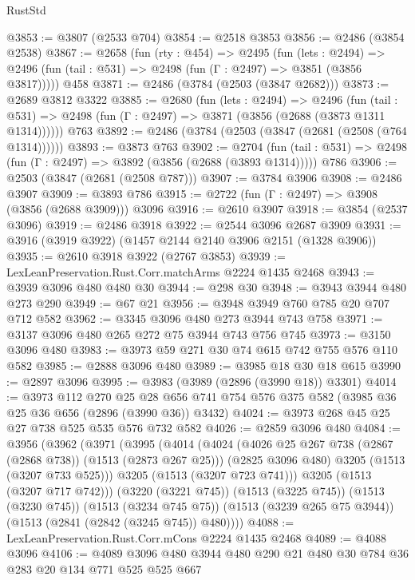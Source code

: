 \begin{lexlean}{RustStd}
\begin{coremodule}
@3853 := @3807 (@2533 @704)
@3854 := @2518 @3853
@3856 := @2486 (@3854 @2538)
@3867 := @2658
    (fun (rty : @454) =>
    @2495
      (fun (lets : @2494) =>
      @2496 (fun (tail : @531) => @2498 (fun (Γ : @2497) => @3851 (@3856 @3817)))))
    @458
@3871 := @2486 (@3784 (@2503 (@3847 @2682)))
@3873 := @2689 @3812 @3322
@3885 := @2680
    (fun (lets : @2494) =>
    @2496
      (fun (tail : @531) => @2498 (fun (Γ : @2497) => @3871 (@3856 (@2688 (@3873 @1311 @1314))))))
    @763
@3892 := @2486 (@3784 (@2503 (@3847 (@2681 (@2508 (@764 @1314))))))
@3893 := @3873 @763
@3902 := @2704
    (fun (tail : @531) => @2498 (fun (Γ : @2497) => @3892 (@3856 (@2688 (@3893 @1314)))))
    @786
@3906 := @2503 (@3847 (@2681 (@2508 @787)))
@3907 := @3784 @3906
@3908 := @2486 @3907
@3909 := @3893 @786
@3915 := @2722 (fun (Γ : @2497) => @3908 (@3856 (@2688 @3909))) @3096
@3916 := @2610 @3907
@3918 := @3854 (@2537 @3096)
@3919 := @2486 @3918
@3922 := @2544 @3096 @2687 @3909
@3931 := @3916 (@3919 @3922) (@1457 @2144 @2140 @3906 @2151 (@1328 @3906))
@3935 := @2610 @3918 @3922 (@2767 @3853)
@3939 := LexLeanPreservation.Rust.Corr.matchArms @2224 @1435 @2468
@3943 := @3939 @3096 @480 @480 @30
@3944 := @298 @30
@3948 := @3943 @3944 @480 @273 @290
@3949 := @67 @21
@3956 := @3948 @3949 @760 @785 @20 @707 @712 @582
@3962 := @3345 @3096 @480 @273 @3944 @743 @758
@3971 := @3137 @3096 @480 @265 @272 @75 @3944 @743 @756 @745
@3973 := @3150 @3096 @480
@3983 := @3973 @59 @271 @30 @74 @615 @742 @755 @576 @110 @582
@3985 := @2888 @3096 @480
@3989 := @3985 @18 @30 @18 @615
@3990 := @2897 @3096
@3995 := @3983 (@3989 (@2896 (@3990 @18)) @3301)
@4014 := @3973
    @112
    @270
    @25
    @28
    @656
    @741
    @754
    @576
    @375
    @582
    (@3985 @36 @25 @36 @656 (@2896 (@3990 @36)) @3432)
@4024 := @3973 @268 @45 @25 @27 @738 @525 @535 @576 @732 @582
@4026 := @2859 @3096 @480
@4084 := @3956
    (@3962
      (@3971
        (@3995
          (@4014
            (@4024
              (@4026 @25 @267 @738 (@2867 (@2868 @738)) (@1513 (@2873 @267 @25)))
              (@2825 @3096 @480)
              @3205
              (@1513 (@3207 @733 @525)))
            @3205
            (@1513 (@3207 @723 @741)))
          @3205
          (@1513 (@3207 @717 @742)))
        (@3220 (@3221 @745))
        (@1513 (@3225 @745))
        (@1513 (@3230 @745))
        (@1513 (@3234 @745 @75))
        (@1513 (@3239 @265 @75 @3944))
        (@1513 (@2841 (@2842 (@3245 @745)) @480))))
@4088 := LexLeanPreservation.Rust.Corr.mCons @2224 @1435 @2468
@4089 := @4088 @3096
@4106 := @4089 @3096 @480 @3944 @480 @290 @21 @480 @30 @784 @36 @283 @20 @134 @771 @525 @525 @667

\end{coremodule}
\end{lexlean}
